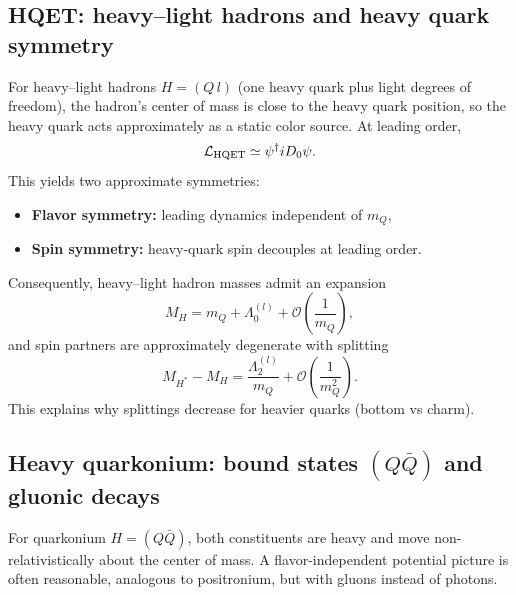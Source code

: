 \subsection{HQET: heavy--light hadrons and heavy quark symmetry}
For heavy--light hadrons $H=(Q\,l)$ (one heavy quark plus light degrees of freedom),
the hadron's center of mass is close to the heavy quark position, so the heavy quark
acts approximately as a static color source. At leading order,
\begin{equation}
\mathcal L_{\rm HQET} \simeq \psi^\dagger iD_0 \psi.
\end{equation}
This yields two approximate symmetries:
\begin{itemize}
  \item \textbf{Flavor symmetry:} leading dynamics independent of $m_Q$,
  \item \textbf{Spin symmetry:} heavy-quark spin decouples at leading order.
\end{itemize}
Consequently, heavy--light hadron masses admit an expansion
\begin{equation}
M_H = m_Q + \Lambda_0^{(l)} + \mathcal O\!\left(\frac{1}{m_Q}\right),
\end{equation}
and spin partners are approximately degenerate with splitting
\begin{equation}
M_{H^\ast}-M_H = \frac{\Lambda_2^{(l)}}{m_Q} + \mathcal O\!\left(\frac{1}{m_Q^2}\right).
\end{equation}
This explains why splittings decrease for heavier quarks (bottom vs charm).

\subsection{Heavy quarkonium: bound states $(Q\bar Q)$ and gluonic decays}
For quarkonium $H=(Q\bar Q)$, both constituents are heavy and move non-relativistically about the
center of mass. A flavor-independent potential picture is often reasonable, analogous to positronium,
but with gluons instead of photons.

